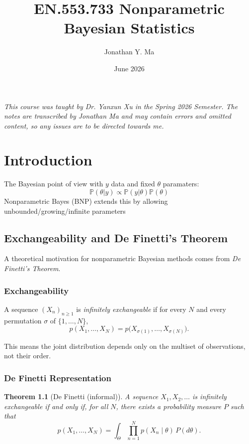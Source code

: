 \documentclass[12pt,oneside]{book}
\title{EN.553.733 Nonparametric Bayesian Statistics}
\author{Jonathan Y. Ma}
\date{June 2026}
\numberwithin{equation}{section}
\theoremstyle{definition}
\theoremstyle{plain}
\newtheorem{theorem}{Theorem}[section]
\theoremstyle{remark}
\begin{document}
\maketitle
\noindent \emph{This course was taught by Dr. Yanxun Xu in the Spring 2026 Semester. The notes are transcribed by Jonathan Ma and may contain errors and omitted content, so any issues are to be directed towards me.}

\tableofcontents

\chapter{Introduction}
The Bayesian point of view with $y$ data and fixed $\theta$ paramaters:
\[
    \mathbb{P} (\theta | y) \propto \mathbb{P} (y|\theta)\mathbb{P} (\theta)
\]
Nonparametric Bayes (BNP) extends this by allowing unbounded/growing/infinite parameters

\section{Exchangeability and De Finetti's Theorem}

A theoretical motivation for nonparametric Bayesian methods comes from \emph{De Finetti's Theorem}.

\subsection*{Exchangeability}

A sequence $(X_n)_{n \ge 1}$ is \emph{infinitely exchangeable} if for every $N$ and every permutation $\sigma$ of $\{1,\ldots,N\}$,
\[
p(X_1, \ldots, X_N) = p\bigl(X_{\sigma(1)}, \ldots, X_{\sigma(N)}\bigr).
\]

This means the joint distribution depends only on the multiset of observations, not their order.

\subsection*{De Finetti Representation}

\begin{theorem}[De Finetti (informal)]
A sequence $X_1, X_2, \ldots$ is infinitely exchangeable if and only if, for all $N$, there exists a probability measure $P$ such that
\[
p(X_1, \ldots, X_N) = \int_{\Theta} \prod_{n=1}^N p(X_n \mid \theta)\, P(d\theta).
\]
\end{theorem}
\end{document}
